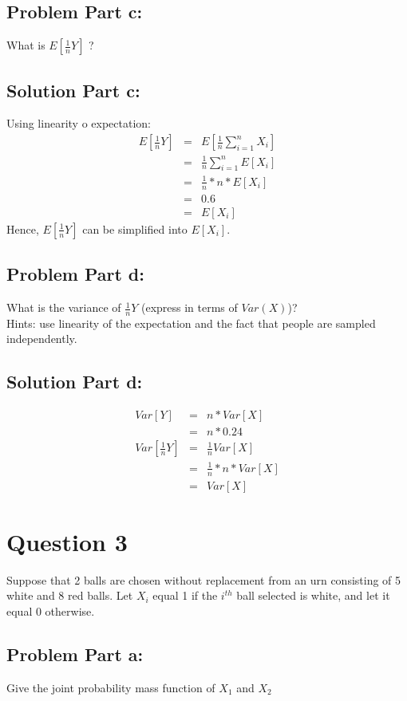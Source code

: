 \documentclass[12pt]{article}%
\begin{document}
\subsection*{Problem Part c:}
What is $E[\frac{1}{n}Y]$ ?
\subsection*{Solution Part c:}
Using linearity o expectation: 
\begin{eqnarray*}
E[\frac{1}{n}Y] & = & E[\frac{1}{n}\sum_{i=1}^{n} X_i] \\
	 & = & \frac{1}{n}\sum_{i=1}^{n} E[X_i] \\
	 & = & \frac{1}{n} * n * E[X_i] \\
	 & = & 0.6 \\
	 & = & E[X_i]
\end{eqnarray*}
Hence, $E[\frac{1}{n}Y]$ can be simplified into $E[X_i]$.
\subsection*{Problem Part d:}
What is the variance of $\frac{1}{n}Y$ (express in terms of $Var(X)$)? \\
Hints: use linearity of the expectation and the fact that people are sampled independently.
\subsection*{Solution Part d:}
\begin{eqnarray*}
    Var[Y]  & = & n * Var[X] \\
    		 & = & n * 0.24 \\
    Var[\frac{1}{n}Y]  & = & \frac{1}{n}Var[X] \\
    				   & = & \frac{1}{n} * n * Var[X] \\
    				   & = & Var[X]
\end{eqnarray*}
\newpage
\section*{Question 3}
Suppose that 2 balls are chosen without replacement from an urn consisting of 5 white and 8 red balls. Let $X_i$ equal 1 if the $i^{th}$ ball selected is white, and let it equal 0 otherwise.
\subsection*{Problem Part a:}
Give the joint probability mass function of $X_1$ and $X_2$
\end{document}
